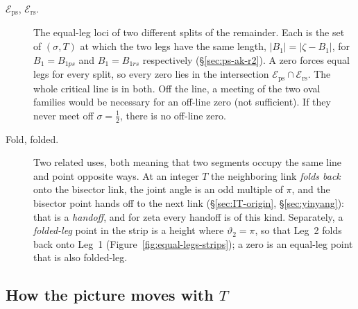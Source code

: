 \documentclass[11pt]{article}
\theoremstyle{definition}
\begin{document}
\begin{description}
\item[$\mathcal{E}_{\mathrm{ps}}$, $\mathcal{E}_{\mathrm{rs}}$.]
The equal-leg loci of two different splits of the remainder.
Each is the set of $(\sigma,T)$ at which the two legs have the
same length, $|B_1|=|\zeta-B_1|$, for $B_1=B_{1ps}$ and
$B_1=B_{1rs}$ respectively
(\S\ref{sec:ps-ak-r2}).
A zero forces equal legs for every split, so every zero lies in
the intersection
$\mathcal{E}_{\mathrm{ps}}\cap\mathcal{E}_{\mathrm{rs}}$.
The whole critical line is in both.
Off the line, a meeting of the two oval families would be
necessary for an off-line zero (not sufficient).
If they never meet off $\sigma=\tfrac12$, there is no off-line
zero.

\item[Fold, folded.]
Two related uses, both meaning that two segments occupy the same
line and point opposite ways.
At an integer $T$ the neighboring link \emph{folds back} onto the
bisector link, the joint angle is an odd multiple of $\pi$, and
the bisector point hands off to the next link
(\S\ref{sec:IT-origin}, \S\ref{sec:yinyang}): that is a
\emph{handoff}, and for zeta every handoff is of this kind.
Separately, a \emph{folded-leg} point in the strip is a height
where $\vartheta_2=\pi$, so that Leg~2 folds back onto Leg~1
(Figure~\ref{fig:equal-legs-strips}); a zero is an equal-leg point
that is also folded-leg.
\end{description}

\subsection*{How the picture moves with $T$}
\end{document}

